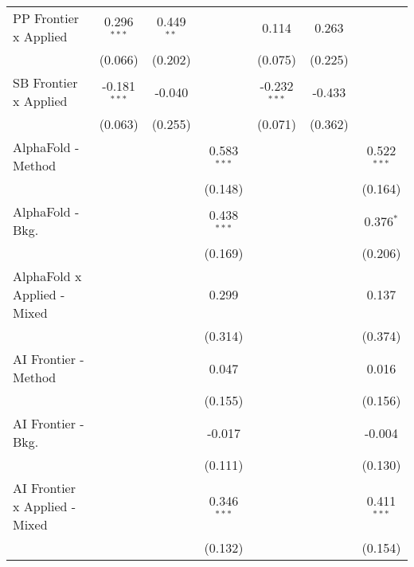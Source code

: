 \begin{tabular}{lcccccc}
   PP Frontier x Applied          & 0.296$^{***}$  & 0.449$^{**}$  &               & 0.114          & 0.263         &   \\   
                                  & (0.066)        & (0.202)       &               & (0.075)        & (0.225)       &   \\   
   SB Frontier x Applied          & -0.181$^{***}$ & -0.040        &               & -0.232$^{***}$ & -0.433        &   \\   
                                  & (0.063)        & (0.255)       &               & (0.071)        & (0.362)       &   \\   
   AlphaFold - Method             &                &               & 0.583$^{***}$ &                &               & 0.522$^{***}$\\   
                                  &                &               & (0.148)       &                &               & (0.164)\\   
   AlphaFold - Bkg.               &                &               & 0.438$^{***}$ &                &               & 0.376$^{*}$\\   
                                  &                &               & (0.169)       &                &               & (0.206)\\   
   AlphaFold x Applied - Mixed    &                &               & 0.299         &                &               & 0.137\\   
                                  &                &               & (0.314)       &                &               & (0.374)\\   
   AI Frontier - Method           &                &               & 0.047         &                &               & 0.016\\   
                                  &                &               & (0.155)       &                &               & (0.156)\\   
   AI Frontier - Bkg.             &                &               & -0.017        &                &               & -0.004\\   
                                  &                &               & (0.111)       &                &               & (0.130)\\   
   AI Frontier x Applied - Mixed  &                &               & 0.346$^{***}$ &                &               & 0.411$^{***}$\\   
                                  &                &               & (0.132)       &                &               & (0.154)\\   

\end{tabular}
